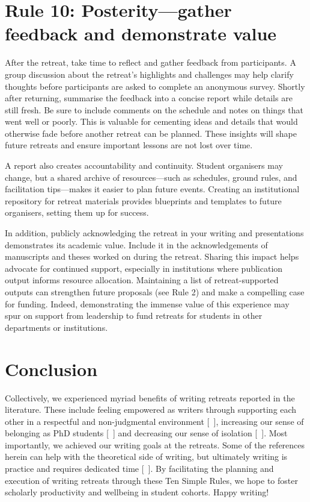 \documentclass[10pt,letterpaper]{article}
\begin{document}
\section*{Rule 10: Posterity—gather feedback and demonstrate value}

After the retreat, take time to reflect and gather feedback from participants. A group discussion about the retreat's highlights and challenges may help clarify thoughts before participants are asked to complete an anonymous survey. Shortly after returning, summarise the feedback into a concise report while details are still fresh. Be sure to include comments on the schedule and notes on things that went well or poorly. This is valuable for cementing ideas and details that would otherwise fade before another retreat can be planned. These insights will shape future retreats and ensure important lessons are not lost over time.

A report also creates accountability and continuity. Student organisers may change, but a shared archive of resources---such as schedules, ground rules, and facilitation tips---makes it easier to plan future events. Creating an institutional repository for retreat materials provides blueprints and templates to future organisers, setting them up for success.

In addition, publicly acknowledging the retreat in your writing and presentations demonstrates its academic value. Include it in the acknowledgements of manuscripts and theses worked on during the retreat. Sharing this impact helps advocate for continued support, especially in institutions where publication output informs resource allocation. Maintaining a list of retreat-supported outputs can strengthen future proposals (see Rule 2) and make a compelling case for funding. Indeed, demonstrating the immense value of this experience may spur on support from leadership to fund retreats for students in other departments or institutions.

\section*{Conclusion}

Collectively, we experienced myriad benefits of writing retreats reported in the literature. These include feeling empowered as writers through supporting each other in a respectful and non-judgmental environment [~\cite{papen2018}], increasing our sense of belonging as PhD students [~\cite{omeara2017}] and decreasing our sense of isolation [~\cite{eardley2021}]. Most importantly, we achieved our writing goals at the retreats. Some of the references herein can help with the theoretical side of writing, but ultimately writing is practice and requires dedicated time [~\cite{peterson2018, grogan2021}]. By facilitating the planning and execution of writing retreats through these Ten Simple Rules, we hope to foster scholarly productivity and wellbeing in student cohorts. Happy writing!
\end{document}
